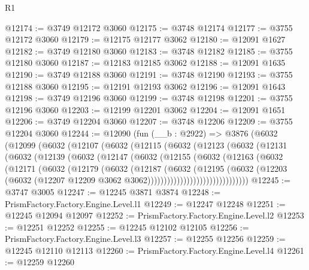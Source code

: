 \begin{lexlean}{R1}
\begin{coremodule}
@12174 := @3749 @12172 @3060
@12175 := @3748 @12174
@12177 := @3755 @12172 @3060
@12179 := @12175 @12177 @3062
@12180 := @12091 @1627
@12182 := @3749 @12180 @3060
@12183 := @3748 @12182
@12185 := @3755 @12180 @3060
@12187 := @12183 @12185 @3062
@12188 := @12091 @1635
@12190 := @3749 @12188 @3060
@12191 := @3748 @12190
@12193 := @3755 @12188 @3060
@12195 := @12191 @12193 @3062
@12196 := @12091 @1643
@12198 := @3749 @12196 @3060
@12199 := @3748 @12198
@12201 := @3755 @12196 @3060
@12203 := @12199 @12201 @3062
@12204 := @12091 @1651
@12206 := @3749 @12204 @3060
@12207 := @3748 @12206
@12209 := @3755 @12204 @3060
@12244 := @12090
    (fun (__b : @2922) =>
    @3876
      (@6032
        (@12099
          (@6032
            (@12107
              (@6032
                (@12115
                  (@6032
                    (@12123
                      (@6032
                        (@12131
                          (@6032
                            (@12139
                              (@6032
                                (@12147
                                  (@6032
                                    (@12155
                                      (@6032
                                        (@12163
                                          (@6032
                                            (@12171
                                              (@6032
                                                (@12179
                                                  (@6032
                                                    (@12187
                                                      (@6032
                                                        (@12195
                                                          (@6032
                                                            (@12203
                                                              (@6032
                                                                (@12207
                                                                  @12209
                                                                  @3062
                                                                  @3062)))))))))))))))))))))))))))))))
@12245 := @3747 @3005
@12247 := @12245 @3871 @3874
@12248 := PrismFactory.Factory.Engine.Level.l1
@12249 := @12247 @12248
@12251 := @12245 @12094 @12097
@12252 := PrismFactory.Factory.Engine.Level.l2
@12253 := @12251 @12252
@12255 := @12245 @12102 @12105
@12256 := PrismFactory.Factory.Engine.Level.l3
@12257 := @12255 @12256
@12259 := @12245 @12110 @12113
@12260 := PrismFactory.Factory.Engine.Level.l4
@12261 := @12259 @12260

\end{coremodule}
\end{lexlean}
